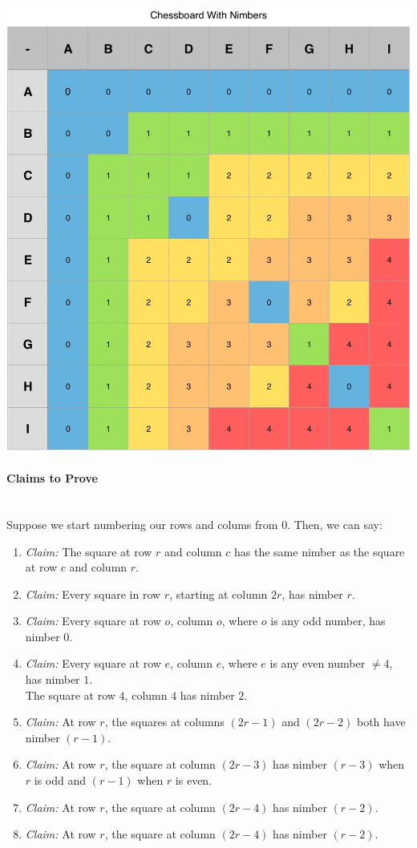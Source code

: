 \documentclass{article}
\begin{document}
\begin{center}
  \includegraphics[scale=0.2]{chessboardWithNimbers}
\end{center}
\paragraph{Claims to Prove}\mbox{}\\
Suppose we start numbering our rows and colums from $0$. Then, we can say:
\begin{enumerate}
  \item \textit{Claim:} The square at row $r$ and column $c$ has the same nimber
    as the square at row $c$ and column $r$.
  \item \textit{Claim:} Every square in row $r$, starting at column $2r$, 
    has nimber $r$.
  \item \textit{Claim:} Every square at row $o$, column $o$, where $o$ is any
    odd number, has nimber $0$.
  \item \textit{Claim:} Every square at row $e$, column $e$, where $e$ is any
    even number $\neq 4$, has nimber $1$. \\
    The square at row $4$, column $4$ has nimber $2$.
  \item \textit{Claim:} At row $r$, the squares at columns $(2r - 1)$ and
    $(2r - 2)$ both have nimber $(r - 1)$.
  \item \textit{Claim:} At row $r$, the square at column $(2r - 3)$
    has nimber $(r - 3)$ when $r$ is odd and $(r - 1)$ when $r$ is even.
  \item \textit{Claim:} At row $r$, the square at column $(2r - 4)$
    has nimber $(r - 2)$.
  \item \textit{Claim:} At row $r$, the square at column $(2r - 4)$
    has nimber $(r - 2)$.
\end{enumerate}
\end{document}
